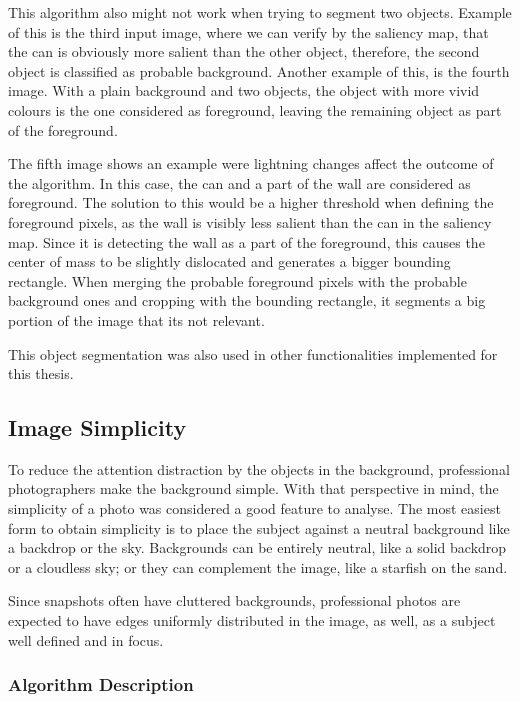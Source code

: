 This algorithm also might not work when trying to segment two objects. Example of this is the third input image, where we can verify by the saliency map, that the can is obviously more salient than the other object, therefore, the second object is classified as probable background. Another example of this, is the fourth image. With a plain background and two objects, the object with more vivid colours is the one considered as foreground, leaving the remaining object as part of the foreground.

The fifth image shows an example were lightning changes affect the outcome of the algorithm. In this case, the can and a part of the wall are considered as foreground. The solution to this would be a higher threshold when defining the foreground pixels, as the wall is visibly less salient than the can in the saliency map. Since it is detecting the wall as a part of the foreground, this causes the center of mass to be slightly dislocated and generates a bigger bounding rectangle. When merging the probable foreground pixels with the probable background ones and cropping with the bounding rectangle, it segments a big portion of the image that its not relevant.

This object segmentation was also used in other functionalities implemented for this thesis.

\subsection{Image Simplicity}
\label{sub:background}

To reduce the attention distraction by the objects in the background, professional photographers make the background simple. With that perspective in mind, the simplicity of a photo was considered a good feature to analyse.
The most easiest form to obtain simplicity is to place the subject against a neutral background like a backdrop or the sky. Backgrounds can be entirely neutral, like a solid backdrop or a cloudless sky; or they can complement the image, like a starfish on the sand.

Since snapshots often have cluttered backgrounds, professional photos are expected to have edges uniformly distributed in the image, as well, as a subject well defined and in focus. 


\subsubsection{Algorithm Description}

